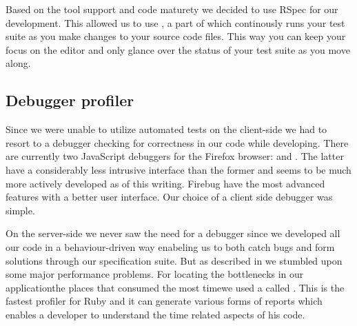 Based on the tool support and code maturety we decided to use RSpec for our
development. This allowed us to use , a part of
%
which continously runs your test suite as you make changes to your source code
files. This way you can keep your focus on the editor and only glance over the
status of your test suite as you move along.

\subsection{Debugger \oldand profiler}

Since we were unable to utilize automated tests on the client-side we had to
resort to a debugger checking for correctness in our code while developing.
There are currently two JavaScript debuggers for the Firefox browser:
%
and .%
The latter have a considerably less intrusive interface than the former and
seems to be much more actively developed as of this writing. Firebug have the
most advanced features with a better user interface. Our choice of a client
side debugger was simple.

On the server-side we never saw the need for a debugger since we developed all
our code in a behaviour-driven way enabeling us to both catch bugs and form
solutions through our specification suite. But as described in
 we stumbled upon some major
performance problems. For locating the bottlenecks in our
application\dash{}the places that consumed the most time\dash{}we used
a %
called .%
This is the fastest profiler for Ruby and it can generate various forms of
reports which enables a developer to understand the time related aspects of
his code.

